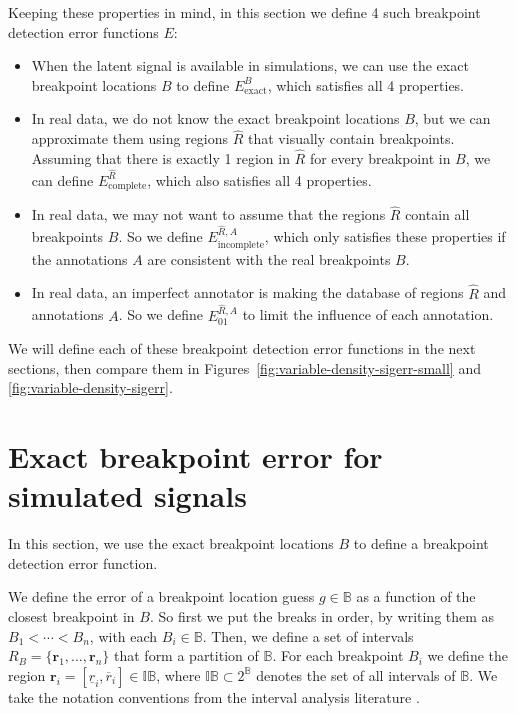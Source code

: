 \documentclass{jsfds} %
\renewcommand{\r}{ \mathbf{ r} }
\newcommand{\rileft}[1][i]{\underline r_{#1}}
\newcommand{\riright}[1][i]{\overline r_{#1}}
\begin{document}
Keeping these properties in mind, in this section we define 4 such
breakpoint detection error functions $E$:
\begin{itemize}
\item When the latent signal is available in simulations, we can use
  the exact breakpoint locations $B$ to define $E^B_{\text{exact}}$,
  which satisfies all 4 properties.
\item In real data, we do not know the exact breakpoint locations $B$,
  but we can approximate them using regions $\hat R$ that visually
  contain breakpoints. Assuming that there is exactly 1 region in
  $\hat R$ for every breakpoint in $B$, we can define
  $E^{\hat R}_{\text{complete}}$, which also satisfies all 4 properties.
\item In real data, we may not want to assume that the regions $\hat
  R$ contain all breakpoints $B$. So we define $E^{\hat
    R,A}_{\text{incomplete}}$, which only satisfies these properties
  if the annotations $A$ are consistent with the real breakpoints $B$.
\item In real data, an imperfect annotator is making the database of
  regions $\hat R$ and annotations $A$. So we define $E_{01}^{\hat
    R,A}$ to limit the influence of each annotation.
\end{itemize}

We will define each of these breakpoint detection error functions in
the next sections, then compare them in
Figures~\ref{fig:variable-density-sigerr-small} and
\ref{fig:variable-density-sigerr}.

\newpage

\section{Exact breakpoint error for simulated signals}
\label{sec:breakpoint_error}

In this section, we use the exact breakpoint locations $B$ to define a
breakpoint detection error function.

We define the error of a breakpoint location guess $g\in\mathbb
B$ as a function of the closest breakpoint in $B$. So
first we put the breaks in order, by writing them as $B_1<\cdots<
B_n$, with each $B_i\in\mathbb B$. Then, we define a set of intervals
$R_B=\{\r_1,\dots,\r_n\}$ that form a partition of $\mathbb B$. For each
breakpoint $B_i$ we define the region
${\r}_i=[\rileft,\riright]\in\mathbb I \mathbb B$, where $\mathbb
I\mathbb B\subset 2^{\mathbb B}$ denotes the set of all intervals of
$\mathbb B$. We take the notation conventions from the interval
analysis literature \citep{intervals}.
\end{document}
